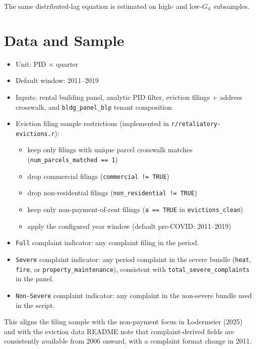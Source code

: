 \documentclass[
  11pt,
]{article}
\providecommand{\tightlist}{%
  \setlength{\itemsep}{0pt}\setlength{\parskip}{0pt}}
\begin{document}
The same distributed-lag equation is estimated on high- and
low-\(G_{it}\) subsamples.

\newpage

\section{Data and Sample}\label{data-and-sample}

\begin{itemize}
\tightlist
\item
  Unit: PID \(\times\) quarter
\item
  Default window: 2011--2019
\item
  Inputs: rental building panel, analytic PID filter, eviction filings +
  address crosswalk, and \texttt{bldg\_panel\_blp} tenant composition
\item
  Eviction filing sample restrictions (implemented in
  \texttt{r/retaliatory-evictions.r}):

  \begin{itemize}
  \tightlist
  \item
    keep only filings with unique parcel crosswalk matches
    (\texttt{num\_parcels\_matched\ ==\ 1})
  \item
    drop commercial filings (\texttt{commercial\ !=\ TRUE})
  \item
    drop non-residential filings (\texttt{non\_residential\ !=\ TRUE})
  \item
    keep only non-payment-of-rent filings (\texttt{a\ ==\ TRUE} in
    \texttt{evictions\_clean})
  \item
    apply the configured year window (default pre-COVID: 2011--2019)
  \end{itemize}
\item
  \texttt{Full} complaint indicator: any complaint filing in the period.
\item
  \texttt{Severe} complaint indicator: any period complaint in the
  severe bundle (\texttt{heat}, \texttt{fire}, or
  \texttt{property\_maintenance}), consistent with
  \texttt{total\_severe\_complaints} in the panel.
\item
  \texttt{Non-Severe} complaint indicator: any complaint in the
  non-severe bundle used in the script.
\end{itemize}

This aligns the filing sample with the non-payment focus in Lodermeier
(2025) and with the eviction data README note that complaint-derived
fields are consistently available from 2006 onward, with a complaint
format change in 2011.
\end{document}

